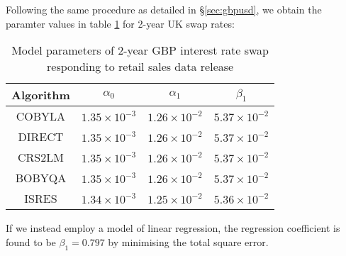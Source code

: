 \documentclass[a4paper,11pt,pdftex,twoside,titlepage]{article}
\begin{document}
Following the same procedure as detailed in \S\ref{sec:gbpusd}, we
obtain the paramter values in table \ref{tab:g546u7} for
2-year UK swap rates:
\begin{table}[htb!]
  \centering
  \begin{tabular}{c|c|c|c}
    Algorithm & $\alpha_0$ & $\alpha_1$ & $\beta_1$ \\
    \hline
    COBYLA & $1.35 \times 10^{-3}$ & $1.26 \times 10^{-2}$ & $5.37 \times 10^{-2}$ \\
    DIRECT & $1.35 \times 10^{-3}$ & $1.26 \times 10^{-2}$ & $5.37 \times 10^{-2}$ \\
    CRS2LM & $1.35 \times 10^{-3}$ & $1.26 \times 10^{-2}$ & $5.37 \times 10^{-2}$ \\
    BOBYQA & $1.35 \times 10^{-3}$ & $1.26 \times 10^{-2}$ & $5.37 \times 10^{-2}$ \\
    ISRES & $1.34 \times 10^{-3}$ & $1.25 \times 10^{-2}$ & $5.36 \times 10^{-2}$ \\
    \hline
  \end{tabular}
  \caption{Model parameters of 2-year GBP interest rate swap
    responding to retail sales data release}
  \label{tab:g546u7}
\end{table}
If we instead employ a model of linear regression, the regression
coefficient is found to be $\beta_1 = 0.797$ by minimising the
total square error.
\end{document}
